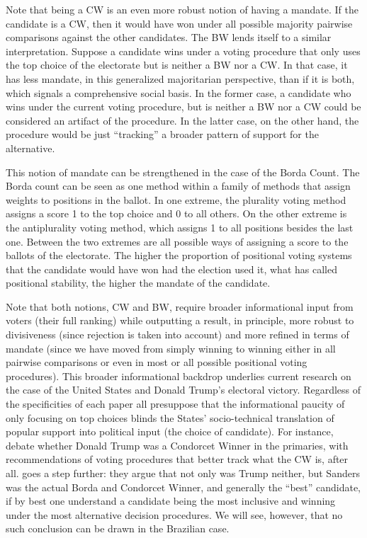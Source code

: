 \documentclass[hidelinks,11pt]{article}
\begin{document}
Note that being a CW is an even more robust notion of having a mandate. If the
candidate is a CW, then it would have won under all possible majority pairwise
comparisons against the other candidates. The BW lends itself to a similar
interpretation. Suppose a candidate wins under a voting procedure that only uses
the top choice of the electorate but is neither a BW nor a CW. In that case, it
has less mandate, in this generalized majoritarian perspective, than if it is
both, which signals a comprehensive social basis. In the former case, a
candidate who wins under the current voting procedure, but is neither a BW nor a
CW could be considered an artifact of the procedure. In the latter case, on the
other hand, the procedure would be just ``tracking'' a broader pattern of
support for the alternative.


This notion of mandate can be strengthened in the case of the Borda Count. The Borda count can be seen as one method within a family of methods that assign weights to positions in the ballot. In one extreme, the plurality voting method assigns a score 1 to the top choice and 0 to all others. On the other extreme is the antiplurality voting method, which assigns 1 to all positions besides the last one. Between the two extremes are all possible ways of assigning a score to the ballots of the electorate. The higher the proportion of positional voting systems that the candidate would have won had the election used it, what \textcite{tabarrok2001president} has called positional stability, the higher the mandate of the candidate.

Note that both notions, CW and BW, require broader informational input from
voters (their full ranking) while outputting a result, in principle, more
robust to divisiveness (since rejection is taken into account) and more refined
in terms of mandate (since we have moved from simply winning to winning either in
all pairwise comparisons or even in most or all possible positional voting
procedures). This broader informational backdrop underlies current research on
the case of the United States and Donald Trump's electoral victory. Regardless
of the specificities of each paper all presuppose that the informational paucity
of only focusing on top choices blinds the States' socio-technical translation
of popular support into political input (the choice of candidate).
For instance, \textcite{potthoff2021condorcet, woon2020trump, kurrild2018trump} debate whether
Donald Trump was a Condorcet Winner in the primaries, with recommendations of
voting procedures that better track what the CW is, after all.
\textcite{igersheim22_compar_votin_method} goes a step further: they argue that
not only was Trump neither, but Sanders was the actual Borda and Condorcet
Winner, and generally the ``best'' candidate, if by best one understand a candidate being the most inclusive and winning under the most alternative
decision procedures. We will see, however, that no such conclusion can be drawn
in the Brazilian case.
\end{document}
